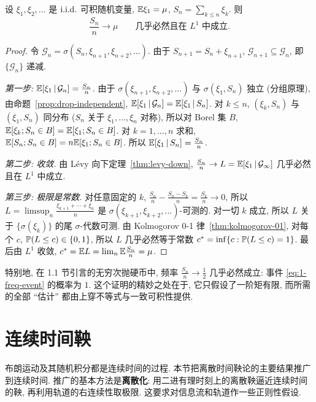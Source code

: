 \begin{theorem}[强大数定律]\label{thm:slln}
设 $\xi_1,\xi_2,\dots$ 是 $\iid$ 可积随机变量, $\E\xi_1=\mu$, $S_n=\sum_{k\le n}\xi_k$. 则
\[
\frac{S_n}{n}\to\mu\qquad\text{几乎必然且在 }L^1\text{ 中成立}.
\]
\end{theorem}

\begin{proof}
令 $\mathcal{G}_n=\sigma(S_n,\xi_{n+1},\xi_{n+2},\dots)$. 由于 $S_{n+1}=S_n+\xi_{n+1}$, $\mathcal{G}_{n+1}\subseteq\mathcal{G}_n$, 即 $\{\mathcal{G}_n\}$ 递减.

\emph{第一步: $\E[\xi_1\,|\,\mathcal{G}_n]=\frac{S_n}{n}$.} 由于 $\sigma(\xi_{n+1},\xi_{n+2},\dots)$ 与 $\sigma(\xi_1,S_n)$ 独立 (分组原理), 由命题~\ref{prop:drop-independent}, $\E[\xi_1\,|\,\mathcal{G}_n]=\E[\xi_1\,|\,S_n]$. 对 $k\le n$, $(\xi_k,S_n)$ 与 $(\xi_1,S_n)$ 同分布 ($S_n$ 关于 $\xi_1,\dots,\xi_n$ 对称), 所以对 Borel 集 $B$, $\E[\xi_k;S_n\in B]=\E[\xi_1;S_n\in B]$. 对 $k=1,\dots,n$ 求和, $\E[S_n;S_n\in B]=n\E[\xi_1;S_n\in B]$. 所以 $\E[\xi_1\,|\,S_n]=\frac{S_n}{n}$.

\emph{第二步: 收敛.} 由 L\'evy 向下定理~\ref{thm:levy-down}, $\frac{S_n}{n}\to L=\E[\xi_1\,|\,\mathcal{G}_\infty]$ 几乎必然且在 $L^1$ 中成立.

\emph{第三步: 极限是常数.} 对任意固定的 $k$, $\frac{S_n}{n}-\frac{S_n-S_k}{n}=\frac{S_k}{n}\to0$, 所以 $L=\limsup_n\frac{\xi_{k+1}+\cdots+\xi_n}{n}$ 是 $\sigma(\xi_{k+1},\xi_{k+2},\dots)$-可测的. 对一切 $k$ 成立, 所以 $L$ 关于 $\{\sigma(\xi_k)\}$ 的尾 $\sigma$-代数可测. 由 Kolmogorov 0-1 律~\ref{thm:kolmogorov-01}, 对每个 $c$, $\P(L\le c)\in\{0,1\}$, 所以 $L$ 几乎必然等于常数 $c^*=\inf\{c: \P(L\le c)=1\}$. 最后由 $L^1$ 收敛, $c^*=\E L=\lim_n\E\frac{S_n}{n}=\mu$.
\end{proof}

\begin{remark}
特别地, 在 1.1 节引言的无穷次抛硬币中, 频率 $\frac{S_n}{n}\to\frac{1}{2}$ 几乎必然成立: 事件 \eqref{eq:1-freq-event} 的概率为 $1$. 这个证明的精妙之处在于, 它只假设了一阶矩有限, 而所需的全部 ``估计'' 都由上穿不等式与一致可积性提供.
\end{remark}

\section{连续时间鞅}
\label{sec:3-5}

布朗运动及其随机积分都是连续时间的过程. 本节把离散时间鞅论的主要结果推广到连续时间. 推广的基本方法是\textbf{离散化}: 用二进有理时刻上的离散鞅逼近连续时间的鞅, 再利用轨道的右连续性取极限. 这要求对信息流和轨道作一些正则性假设.

